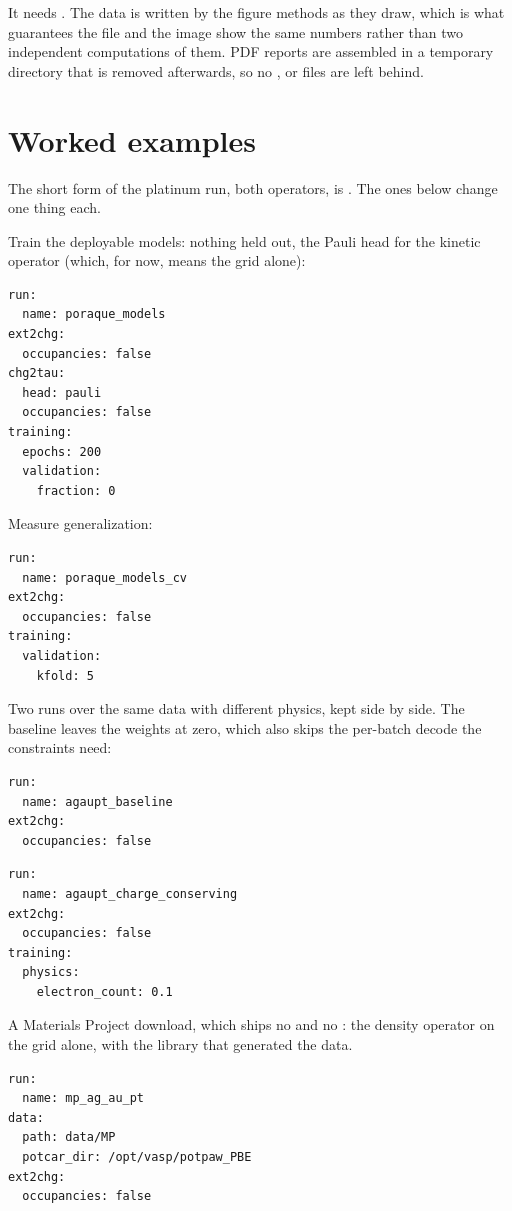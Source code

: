 It needs . The data is written by the figure methods as they draw, which is what guarantees the file and the image show the same numbers rather than two independent computations of them. PDF reports are assembled in a temporary directory that is removed afterwards, so no ,  or  files are left behind.

\section{Worked examples}

The short form of the platinum run, both operators, is . The ones below change one thing each.

Train the deployable models: nothing held out, the Pauli head for the kinetic operator (which, for now, means the grid alone):

\begin{lstlisting}
run:
  name: poraque_models
ext2chg:
  occupancies: false
chg2tau:
  head: pauli
  occupancies: false
training:
  epochs: 200
  validation:
    fraction: 0
\end{lstlisting}

Measure generalization:

\begin{lstlisting}
run:
  name: poraque_models_cv
ext2chg:
  occupancies: false
training:
  validation:
    kfold: 5
\end{lstlisting}

Two runs over the same data with different physics, kept side by side. The baseline leaves the weights at zero, which also skips the per-batch decode the constraints need:

\begin{lstlisting}
run:
  name: agaupt_baseline
ext2chg:
  occupancies: false
\end{lstlisting}

\begin{lstlisting}
run:
  name: agaupt_charge_conserving
ext2chg:
  occupancies: false
training:
  physics:
    electron_count: 0.1
\end{lstlisting}

A Materials Project download, which ships no  and no : the density operator on the grid alone, with the library that generated the data.

\begin{lstlisting}
run:
  name: mp_ag_au_pt
data:
  path: data/MP
  potcar_dir: /opt/vasp/potpaw_PBE
ext2chg:
  occupancies: false
\end{lstlisting}

